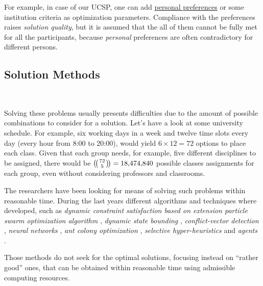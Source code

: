 \documentclass[ThesisDoc]{subfiles}
\begin{document}
  For example, in case of our UCSP,
one can add \underline{personal preferences} or some institution criteria as
optimization parameters.
  Compliance with the preferences raises \emph{solution quality},
but it is assumed that the all of them cannot be fully met for all the
participants, because \emph{personal} preferences are often
contradictory for different persons.

\subsection{Solution Methods}
\\
\medskip

\noindent
  Solving these problems usually presents difficulties due to the amount of
possible combinations to consider for a solution. Let's have a look at
some university schedule.
  For example, six working days in a week and twelve time slots every day
(every hour from 8:00 to 20:00), would yield $6 \times 12 = 72$ options
to place each class.
  Given that each group needs, for example, five different disciplines to be assigned,
there would be  $\multibinom{72}{5} = \num[group-separator={,}]{18474840}$
possible classes assignments for each group,
even without considering professors and classrooms.

\bigskip
 \todo
\medskip
\noindent

  The researchers have been looking for means of solving such
problems within reasonable time.
  During the last years different algorithms and techniques where developed,
such as
\emph{dynamic constraint satisfaction based on extension particle swarm
      optimization algorithm} \cite{CSPswarm},
\emph{dynamic state bounding} \cite{CSPdynStateBound},
\emph{conflict-vector detection} \cite{CSPtimetable},
\emph{neural networks} \cite{CSPneuro},
\emph{ant colony optimization} \cite{CSPcunningACO, CSPlimmemACO},
\emph{selective hyper-heuristics} \cite{CSPhypHeur}
and \emph{agents} \cite{CSPagent2013, CSPagent2014, DCSPagent1998}.

\medskip

Those methods do not seek for the optimal solutions, focusing instead on
``rather good'' ones, that can be obtained within reasonable time using admissible
computing resources.
\end{document}
